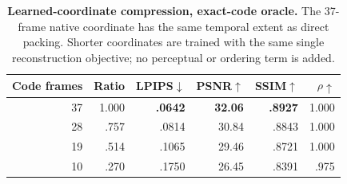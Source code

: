 \begin{table}[t]
\centering
\caption{\textbf{Learned-coordinate compression, exact-code oracle.} The
37-frame native coordinate has the same temporal extent as direct packing.
Shorter coordinates are trained with the same single reconstruction objective;
no perceptual or ordering term is added.}
\label{tab:coordinate_compression}
\footnotesize
\setlength{\tabcolsep}{3.5pt}
\begin{tabular}{rrrrrr}
\toprule
Code frames & Ratio & LPIPS$\downarrow$ & PSNR$\uparrow$ & SSIM$\uparrow$ & $\rho\uparrow$ \\
\midrule
37 & 1.000 & \textbf{.0642} & \textbf{32.06} & \textbf{.8927} & 1.000 \\
28 & .757 & .0814 & 30.84 & .8843 & 1.000 \\
19 & .514 & .1065 & 29.46 & .8721 & 1.000 \\
10 & .270 & .1750 & 26.45 & .8391 & .975 \\
\bottomrule
\end{tabular}
\end{table}
